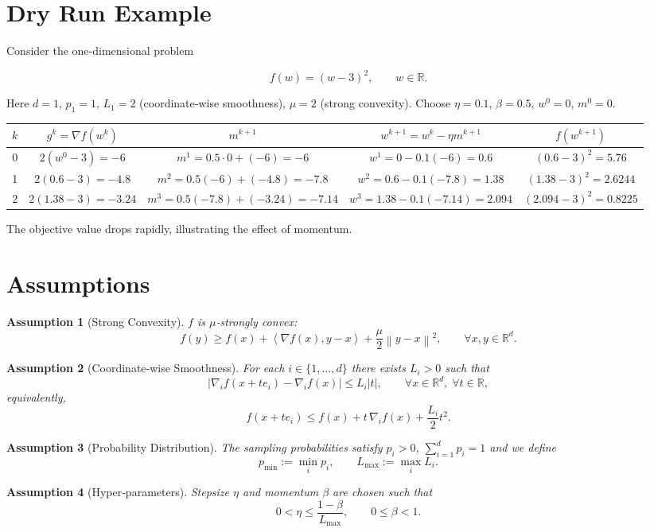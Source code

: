\documentclass{article}
\newtheorem{assumption}{Assumption}
\newcommand{\R}{\mathbb{R}}
\newcommand{\norm}[1]{\left\lVert#1\right\rVert}
\newcommand{\ip}[2]{\left\langle #1,#2\right\rangle}
\begin{document}
\section*{Dry Run Example}
Consider the one‑dimensional problem  

\[
f(w)=(w-3)^{2},\qquad w\in\R .
\]

Here $d=1$, $p_1=1$, $L_1=2$ (coordinate‑wise smoothness), $\mu=2$ (strong convexity).  
Choose $\eta=0.1$, $\beta=0.5$, $w^{0}=0$, $m^{0}=0$.

\begin{center}
\begin{tabular}{c|c|c|c|c}
$k$ & $g^{k}=\nabla f(w^{k})$ & $m^{k+1}$ & $w^{k+1}=w^{k}-\eta m^{k+1}$ & $f(w^{k+1})$ \\ \hline
0 & $2(w^{0}-3)=-6$ & $m^{1}=0.5\cdot0+(-6)=-6$ & $w^{1}=0-0.1(-6)=0.6$ & $(0.6-3)^{2}=5.76$ \\
1 & $2(0.6-3)=-4.8$ & $m^{2}=0.5(-6)+(-4.8)=-7.8$ & $w^{2}=0.6-0.1(-7.8)=1.38$ & $(1.38-3)^{2}=2.6244$ \\
2 & $2(1.38-3)=-3.24$ & $m^{3}=0.5(-7.8)+(-3.24)=-7.14$ & $w^{3}=1.38-0.1(-7.14)=2.094$ & $(2.094-3)^{2}=0.8225$ 
\end{tabular}
\end{center}
The objective value drops rapidly, illustrating the effect of momentum.

\newpage
\section*{Assumptions}
\begin{assumption}[Strong Convexity]\label{ass:strong}
$f$ is $\mu$‑strongly convex:
\[
f(y)\ge f(x)+\ip{\nabla f(x)}{y-x}+\frac{\mu}{2}\norm{y-x}^{2},\qquad \forall x,y\in\R^{d}.
\]
\end{assumption}
\begin{assumption}[Coordinate‑wise Smoothness]\label{ass:smooth}
For each $i\in\{1,\dots,d\}$ there exists $L_i>0$ such that
\[
\bigl|\nabla_{i}f(x+te_i)-\nabla_{i}f(x)\bigr|\le L_i|t|,\qquad\forall x\in\R^{d},\;\forall t\in\R,
\]
equivalently,
\[
f(x+te_i)\le f(x)+t\,\nabla_{i}f(x)+\frac{L_i}{2}t^{2}.
\]
\end{assumption}
\begin{assumption}[Probability Distribution]\label{ass:prob}
The sampling probabilities satisfy $p_i>0$, $\sum_{i=1}^{d}p_i=1$ and we define
\[
p_{\min}:=\min_i p_i,\qquad L_{\max}:=\max_i L_i .
\]
\end{assumption}
\begin{assumption}[Hyper‑parameters]\label{ass:hyper}
Stepsize $\eta$ and momentum $\beta$ are chosen such that
\[
0<\eta\le \frac{1-\beta}{L_{\max}},\qquad 0\le\beta<1 .
\tag{A4}
\]
\end{assumption}
\end{document}
